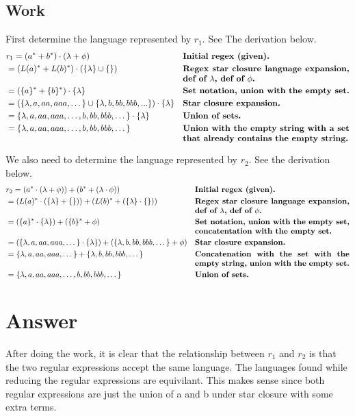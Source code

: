 \documentclass{assignment-x}
\begin{document}
\subsection{Work}
First determine the language represented by $r_1$. See The derivation below.
\begin{align*}
    \proofline{r_1 = (a^* + b^*) \cdot (\lambda + \phi)}{Initial regex (given).}
    \proofline{= (L(a)^* + L(b)^*) \cdot (\{\lambda\} \cup \{\})}{Regex star closure language expansion, def of $\lambda$, def of $\phi$.}
    \proofline{= (\{a\}^*+\{b\}^*) \cdot \{\lambda\}}{Set notation, union with the empty set.}
    \proofline{= (\{\lambda, a,aa,aaa,\dots\} \cup \{\lambda,b,bb,bbb,...\}) \cdot \{\lambda\}}{Star closure expansion.}
    \proofline{= \{\lambda,a,aa,aaa,\dots,b,bb,bbb,\dots\} \cdot \{\lambda\}}{Union of sets.}
    \proofline{= \{\lambda,a,aa,aaa,\dots,b,bb,bbb,\dots\} }{Union with the empty string with a set that already contains the empty string.}
\end{align*}

We also need to determine the language represented by $r_2$. See the derivation below.
\begin{align*}
    \proofline{r_2=(a^* \cdot (\lambda + \phi)) + (b^*+(\lambda \cdot \phi))}{Initial regex (given).}
    \proofline{= (L(a)^* \cdot (\{\lambda\}+ \{\})) + (L(b)^*+(\{\lambda\} \cdot \{\}))}{Regex star closure language expansion, def of $\lambda$, def of $\phi$.}
    \proofline{= (\{a\}^*\cdot\{\lambda\})+(\{b\}^*+ \phi)}{Set notation, union with the empty set, concatentation with the empty set.}
    \proofline{= (\{\lambda,a,aa,aaa,\dots\} \cdot \{\lambda\}) + (\{\lambda,b,bb,bbb,\dots\} + \phi)}{Star closure expansion.}
    \proofline{= \{\lambda,a,aa,aaa,\dots\} + \{\lambda,b,bb,bbb,\dots\}}{Concatenation with the set with the empty string, union with the empty set.}
    \proofline{= \{\lambda,a,aa,aaa,\dots,b,bb,bbb,\dots\}}{Union of sets.}
\end{align*}

\section{Answer}
After doing the work, it is clear that the relationship between $r_1$ and $r_2$ is that the two regular expressions accept the same language. The languages found while reducing the regular expressions are equivilant. This makes sense since both regular expressions are just the union of a and b under star closure with some extra terms.
\end{document}
